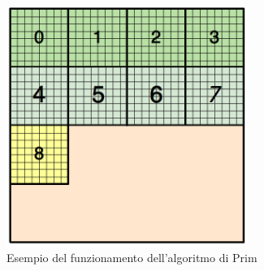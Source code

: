 \begin{figure}[H]
	\centering
	\includegraphics[width=0.7\textwidth]{immagini/block_on_grid.png}
	\caption{Esempio del funzionamento dell'algoritmo di Prim}
	\label{fig:prim_alg}
\end{figure}

